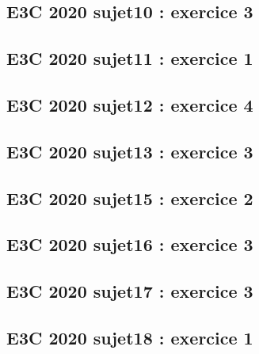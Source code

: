 \documentclass[lang=fr,edition=teacher,layout=sheet]{mxbook}
\begin{document}
\subsection*{E3C 2020 sujet10 : exercice 3}
\begingroup\endgroup
\par\bigskip
{}\subsection*{E3C 2020 sujet11 : exercice 1}
\begingroup\endgroup
\par\bigskip
{}\subsection*{E3C 2020 sujet12 : exercice 4}
\begingroup\endgroup
\par\bigskip
{}\subsection*{E3C 2020 sujet13 : exercice 3}
\begingroup\endgroup
\par\bigskip
{}\subsection*{E3C 2020 sujet15 : exercice 2}
\begingroup\endgroup
\par\bigskip
{}\subsection*{E3C 2020 sujet16 : exercice 3}
\begingroup\endgroup
\par\bigskip
{}\subsection*{E3C 2020 sujet17 : exercice 3}
\begingroup\endgroup
\par\bigskip
{}\subsection*{E3C 2020 sujet18 : exercice 1}
\end{document}
